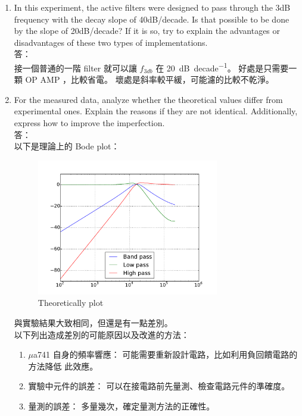 \documentclass[12pt, a4paper]{article}
\begin{document}
\begin{enumerate}[itemsep=20pt, topsep=10pt]

  \item {In this experiment, the active filters were designed to pass through the 3dB frequency with the decay slope of 40dB/decade. Is that possible to be done by the slope of 20dB/decade? If it is so, try to explain the advantages or disadvantages of these two types of implementations.} \\[10pt]
    答：\\
    接一個普通的一階 filter 就可以讓 $f_{3db}$ 在 \SI{20}{\dB\per decade}。
    好處是只需要一顆 OP AMP ，比較省電。 壞處是斜率較平緩，可能濾的比較不乾淨。
      

  \item {For the measured data, analyze whether the theoretical values differ from experimental ones. Explain the reasons if they are not identical. Additionally, express how to improve the imperfection.} \\[10pt]
    答：\\
    以下是理論上的 Bode plot：
    \begin{figure}[H]
      \begin{center}
        \includegraphics[width=0.75\textwidth]{fig2.pdf}
      \end{center}
      \caption{Theoretically plot}
      \label{fig:}
    \end{figure}
    與實驗結果大致相同，但還是有一點差別。 \\
    以下列出造成差別的可能原因以及改進的方法：
    \begin{enumerate}
      \itemsep=0pt
      \item $\mu$a741 自身的頻率響應： 可能需要重新設計電路，比如利用負回饋電路的方法降低
        此效應。
      \item 實驗中元件的誤差： 可以在接電路前先量測、檢查電路元件的準確度。
      \item 量測的誤差： 多量幾次，確定量測方法的正確性。
    \end{enumerate}



\end{enumerate}
\end{document}
